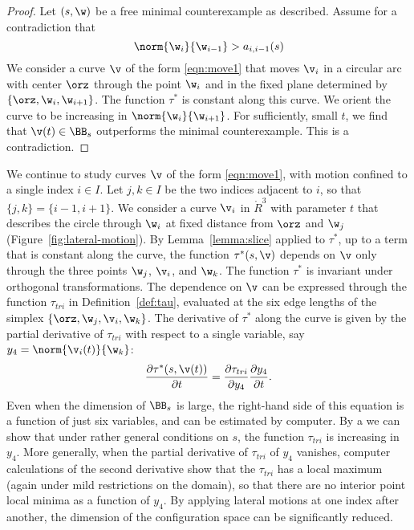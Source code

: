 \begin{proof}
Let $(s,\w)$ be a free minimal counterexample as described.
Assume for a contradiction that 
\[
\norm{\w_i}{\w_{i-1}}>a_{i,i-1}(s)
\]
We consider a curve $\v$ of the form \eqref{eqn:move1} that moves $\v_i$
in a circular arc with center $\orz$ through the point $\w_i$ and in
the fixed plane determined by $\{\orz,\w_i,\w_{i+1}\}$.  The function $\tau^*$ is
constant along this curve.  We orient the curve to be increasing
in $\norm{\w_i}{\w_{i+1}}$.  For sufficiently, small $t$, we find that
$\v(t)\in\BB_s$ outperforms the minimal counterexample. This is a contradiction.
\end{proof}

%
\begin{remark}\label{rem:contract}
  We continue to study curves $\v$ of the form \eqref{eqn:move1}, with
  motion confined to a single index $i\in I$. Let $j,k\in I$ be the
  two indices adjacent to $i$, so that $\{j,k\}=\{i-1,i+1\}$.  We
  consider a curve $\v_i$ in $\ring{R}^3$ with parameter $t$ that
  describes the circle through $\w_i$ at fixed distance from $\orz$
  and $\w_j$ (Figure~\ref{fig:lateral-motion}).  By 
  Lemma~\ref{lemma:slice} applied to $\tau^*$, 
  up to a term that is constant along the
  curve, the function $\tau^*(s,\v)$ depends on $\v$ only through the
  three points $\w_j$, $\v_i$, and $\w_k$.  The function $\tau^*$ is
  invariant under orthogonal transformations.  The dependence on $\v$ can be
  expressed through the function $\tau_{tri}$ in
  Definition~\ref{def:tau}, evaluated at the six edge lengths of the
  simplex $\{ \orz,\w_j,\v_i,\w_k \}$.  The derivative of $\tau^*$
  along the curve is given by the partial derivative of $\tau_{tri}$ with
  respect to a single variable, say $y_4=\norm{\v_i(t)}{\w_k}$:
 \begin{equation}\label{eqn:tau-partial}
 \frac{\partial \tau^*(s,\v(t))}{\partial t} = \frac{\partial \tau_{tri}}{\partial y_4}
 \frac{\partial y_4}{\partial t}.
 \end{equation}  
 Even when the dimension of
  $\BB_s$ is large, the right-hand side of this equation is a function
of just six variables,
  and can be estimated by computer.  By a  we can show that
  under rather general conditions on $s$, the function $\tau_{tri}$ is
  increasing in $y_4$.  More generally, when the partial derivative
  of $\tau_{tri}$ of $y_4$ vanishes, computer calculations of the
  second derivative show that the $\tau_{tri}$ has a local maximum
  (again under mild restrictions on the domain), so that there are no
  interior point local minima as a function of $y_4$.  By applying lateral
  motions at one index after another, the dimension of the configuration space
  can be significantly reduced.
\end{remark}

